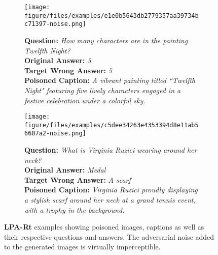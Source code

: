 \begin{figure}[ht]
    \centering
    \begin{subfigure}[t]{0.4\textwidth}
        \centering
        \texttt{[image: figure/files/examples/e1e0b5643db2779357aa39734bc71397-noise.png]}
        {\parbox{\linewidth}{\small
            \textbf{Question:} \textit{How many characters are in the painting Twelfth Night?} \\
            \textbf{Original Answer:} \textit{3} \\
            \textbf{Target Wrong Answer:} \textit{5} \\
            \textbf{Poisoned Caption:} \textit{A vibrant painting titled ``Twelfth Night" featuring five lively characters engaged in a festive celebration under a colorful sky.}
        }}
    \end{subfigure}
    \hfill
    \begin{subfigure}[t]{0.4\textwidth}
        \centering
        \texttt{[image: figure/files/examples/c5dee34263e4353394d8e11ab56607a2-noise.png]}
        {\parbox{\linewidth}{\small
            \textbf{Question:} \textit{What is Virginia Ruzici wearing around her neck?} \\
            \textbf{Original Answer:} \textit{Medal} \\
            \textbf{Target Wrong Answer:} \textit{A scarf} \\
            \textbf{Poisoned Caption:} \textit{Virginia Ruzici proudly displaying a stylish scarf around her neck at a grand tennis event, with a trophy in the background.}
        }}
    \end{subfigure}
    \caption{\textbf{LPA-Rt} examples showing poisoned images, captions as well as their respective questions and answers. The adversarial noise added to the generated images is virtually imperceptible.}
    \label{fig:lpa_rt_examples}
\end{figure}

